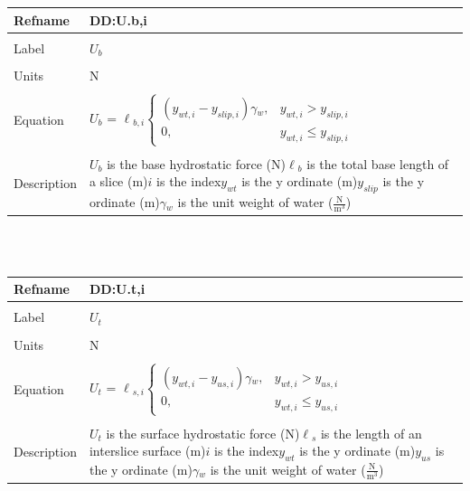 \documentclass[12pt]{article}
\begin{document}
\noindent \begin{minipage}{\textwidth}
\begin{tabular}{p{} p{}}
\toprule \textbf{Refname} & \textbf{DD:U.b,i}
\label{DD:U.b,i}
\\ \midrule \\
Label & $U_{b}$
\\ \midrule \\
Units & N
\\ \midrule \\
Equation & $U_{b}$ = $\ell{}_{b,i}\begin{cases}
\left(y_{wt,i}-y_{slip,i}\right)\gamma{}_{w}, & y_{wt,i}>y_{slip,i}\\
0, & y_{wt,i}\leq{}y_{slip,i}
\end{cases}$
\\ \midrule \\
Description & $U_{b}$ is the base hydrostatic force (N)\newline$\ell{}_{b}$ is the total base length of a slice (m)\newline$i$ is the index\newline$y_{wt}$ is the y ordinate (m)\newline$y_{slip}$ is the y ordinate (m)\newline$\gamma{}_{w}$ is the unit weight of water ($\frac{\text{N}}{\text{m}^{3}}$)
\\ \bottomrule \end{tabular}
\end{minipage}\\
~\newline
\noindent \begin{minipage}{\textwidth}
\begin{tabular}{p{} p{}}
\toprule \textbf{Refname} & \textbf{DD:U.t,i}
\label{DD:U.t,i}
\\ \midrule \\
Label & $U_{t}$
\\ \midrule \\
Units & N
\\ \midrule \\
Equation & $U_{t}$ = $\ell{}_{s,i}\begin{cases}
\left(y_{wt,i}-y_{us,i}\right)\gamma{}_{w}, & y_{wt,i}>y_{us,i}\\
0, & y_{wt,i}\leq{}y_{us,i}
\end{cases}$
\\ \midrule \\
Description & $U_{t}$ is the surface hydrostatic force (N)\newline$\ell{}_{s}$ is the length of an interslice surface (m)\newline$i$ is the index\newline$y_{wt}$ is the y ordinate (m)\newline$y_{us}$ is the y ordinate (m)\newline$\gamma{}_{w}$ is the unit weight of water ($\frac{\text{N}}{\text{m}^{3}}$)
\\ \bottomrule \end{tabular}
\end{minipage}\\
\end{document}

